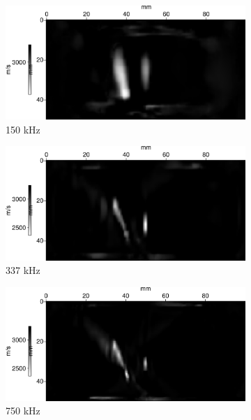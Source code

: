 \documentclass[a4paper,11pt]{report} %
\newenvironment{changemargin}[2]{\begin{list}{}{%
\setlength{\topsep}{0pt}%
\setlength{\leftmargin}{0pt}%
\setlength{\rightmargin}{0pt}%
\setlength{\listparindent}{\parindent}%
\setlength{\itemindent}{\parindent}%
\setlength{\parsep}{0pt plus 1pt}%
\addtolength{\leftmargin}{#1}%
\addtolength{\rightmargin}{#2}%
\setlength{\textwidth}{21cm}
}\item }{\end{list}}
\begin{document}
\begin{figure}[!h]
\begin{changemargin}{-2cm}{-2cm}
		\begin{subfigure}[b]{0.23\textwidth}
			\includegraphics[width=\textwidth]{img/multi_trans/vs_multi_150k.png}
			\caption{150 kHz}
		\end{subfigure}
		\begin{subfigure}[b]{0.23\textwidth}
			\includegraphics[width=\textwidth]{img/multi_trans/vs_multi_337k.png}
			\caption{337 kHz}
		\end{subfigure}
		\begin{subfigure}[b]{0.23\textwidth}
			\includegraphics[width=\textwidth]{img/multi_trans/vs_multi_750k.png}
			\caption{750 kHz}
		\end{subfigure}
		\begin{subfigure}[b]{0.23\textwidth}

\end{subfigure}
\end{changemargin}
\end{figure}
\end{document}
